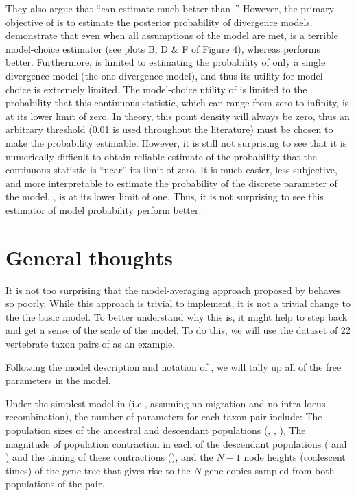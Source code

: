 \documentclass[letterpaper,12pt]{article}
\begin{document}
\begin{linenumbers}
They also argue that ``\msb can estimate \vmratio{} much better than \numt{}.''
However, the primary objective of \msb is to estimate the posterior probability
of divergence models.
\citet{Oaks2012} demonstrate that even when all assumptions of the model are
met, \vmratio is a terrible model-choice estimator (see plots B, D \& F of
Figure 4), whereas \numt{} performs better.
Furthermore, \vmratio{} is limited to estimating the probability of only a
single divergence model (the one divergence model), and thus its utility for
model choice is extremely limited.
The model-choice utility of \vmratio{} is limited to the probability that
this continuous statistic, which can range from zero to infinity, is at its lower
limit of zero. In theory, this point density will always be zero, thus an
arbitrary threshold (0.01 is used throughout the \msb literature) must 
be chosen to make the probability estimable.
However, it is still not surprising to see that it is numerically difficult to
obtain reliable estimate of the probability that the continuous \vmratio{}
statistic is ``near'' its limit of zero.
It is much easier, less subjective, and more interpretable to estimate
the probability of the discrete parameter of the model, \numt{}, is
at its lower limit of one.
Thus, it is not surprising to see this estimator of model probability
perform better.

\section*{General thoughts}
It is not too surprising that the model-averaging approach proposed by
\citet{Hickerson2013} behaves so poorly.
While this approach is trivial to implement, it is not a trivial change
to the the basic \msb model.
To better understand why this is, it might help to step back and get a
sense of the scale of the \msb model.
To do this, we will use the dataset of 22 vertebrate taxon pairs of
\citet{Oaks2012} as an example.

Following the model description and notation of \citet{Oaks2012}, we
will tally up all of the free parameters in the \msb model.

Under the simplest model in \msb (i.e., assuming no migration and
no intra-locus recombination), the number of parameters for each
taxon pair include:
The population sizes of the ancestral and descendant populations
(\ancestralTheta{}, , ),
The magnitude of population contraction in each of the descendant
populations ( and ) and the
timing of these contractions (\bottleTime{}), and the $N-1$ node heights
(coalescent times) of the gene tree that gives rise to the $N$ gene
copies sampled from both populations of the pair.


\end{linenumbers}
\end{document}
